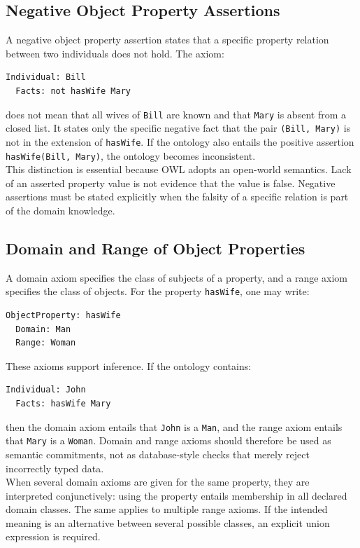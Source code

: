 \documentclass{scrbook}
\begin{document}
	\subsection{Negative Object Property Assertions}
	
	A negative object property assertion states that a specific property relation between two individuals does not hold. The axiom:
	\begin{lstlisting}
Individual: Bill
  Facts: not hasWife Mary
	\end{lstlisting}
	does not mean that all wives of \texttt{Bill} are known and that \texttt{Mary} is absent from a closed list. It states only the specific negative fact that the pair \texttt{(Bill, Mary)} is not in the extension of \texttt{hasWife}. If the ontology also entails the positive assertion \texttt{hasWife(Bill, Mary)}, the ontology becomes inconsistent.\\
	
	This distinction is essential because OWL adopts an open-world semantics. Lack of an asserted property value is not evidence that the value is false. Negative assertions must be stated explicitly when the falsity of a specific relation is part of the domain knowledge.
	
	\subsection{Domain and Range of Object Properties}
	
	A domain axiom specifies the class of subjects of a property, and a range axiom specifies the class of objects. For the property \texttt{hasWife}, one may write:
	\begin{lstlisting}
ObjectProperty: hasWife
  Domain: Man
  Range: Woman
	\end{lstlisting}
	
	These axioms support inference. If the ontology contains:
	\begin{lstlisting}
Individual: John
  Facts: hasWife Mary
	\end{lstlisting}
	then the domain axiom entails that \texttt{John} is a \texttt{Man}, and the range axiom entails that \texttt{Mary} is a \texttt{Woman}. Domain and range axioms should therefore be used as semantic commitments, not as database-style checks that merely reject incorrectly typed data.\\
	
	When several domain axioms are given for the same property, they are interpreted conjunctively: using the property entails membership in all declared domain classes. The same applies to multiple range axioms. If the intended meaning is an alternative between several possible classes, an explicit union expression is required.
	
\end{document}
